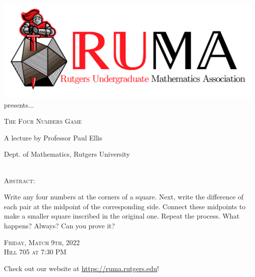 \documentclass[12pt]{article}
\begin{document}

\begin{center}\includegraphics[scale=.4]{RUMAlogo.png}\\
\large  presents... \\

\vspace{1mm}
\begin{spacing}{2}
{\fontsize{32}{18}\selectfont  \textsc{
    The Four Numbers Game
    }} \end{spacing}
 
\begin{spacing}{1}
{\fontsize{24}{18} \selectfont A lecture by Professor Paul Ellis}  \end{spacing} 
\large Dept. of Mathematics, Rutgers University \\~~\\

\normalsize

\vspace{10mm}

\textsc{Abstract:}



\LARGE
Write any four numbers at the corners of a square.  Next, write the difference of each pair at the midpoint of the corresponding side.  Connect these midpoints to make a smaller square inscribed in the original one.  Repeat the process.  What happens?  Always?  Can you prove it?

\vspace{10mm}

\begin{spacing}{1.5}
    {\fontsize{24}{28}\selectfont  \textsc{
        Friday, Match 9th, 2022 \\ Hill 705 at 7:30 PM}
    } 
\end{spacing}

\Large  Check out our website at 
\url{https://ruma.rutgers.edu}!
\end{center}
\end{document}
